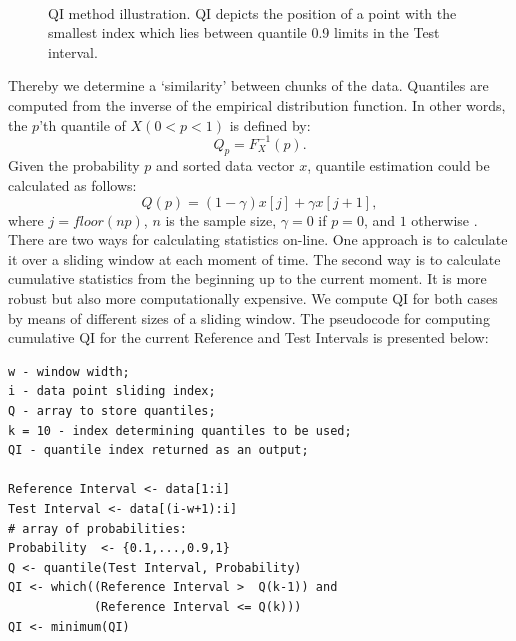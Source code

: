 \begin{figure}[htb!]
\\
\caption{QI method illustration. %
QI depicts the position of a point with the smallest index which lies between quantile 0.9 limits
in the Test interval.}
\label{fig:QI_scheme}
\end{figure}

Thereby we determine a `similarity' between chunks of the data.
Quantiles are computed from the inverse of the empirical distribution function.
In other words, the $p$'th quantile of $X(0<p<1)$ is defined by:
\[
Q_{p}=F_{X}^{-1}(p).
\]
Given the probability $p$ and sorted data vector $x$, quantile estimation could be calculated as follows:
\[
Q(p) = (1-\gamma)x[j] + \gamma x[j+1],
\]
where $j=floor(np)$, $n$ is the sample size, $\gamma = 0$ if $p=0$, and $1$ otherwise \cite{Rref}.
There are two ways for calculating statistics on-line.
One approach is to calculate it over a sliding window at each moment of time. %
The second way is to calculate cumulative statistics from the beginning up to the current moment.
It is more robust but also more computationally expensive.
We compute QI for both cases by means of different sizes of a sliding window.
The pseudocode for computing cumulative QI for the current Reference and Test Intervals is presented below:
\begin{verbatim}
w - window width; 
i - data point sliding index;
Q - array to store quantiles;
k = 10 - index determining quantiles to be used;
QI - quantile index returned as an output;

Reference Interval <- data[1:i]
Test Interval <- data[(i-w+1):i]
# array of probabilities:
Probability  <- {0.1,...,0.9,1}
Q <- quantile(Test Interval, Probability)
QI <- which((Reference Interval >  Q(k-1)) and
            (Reference Interval <= Q(k)))
QI <- minimum(QI)
\end{verbatim}

